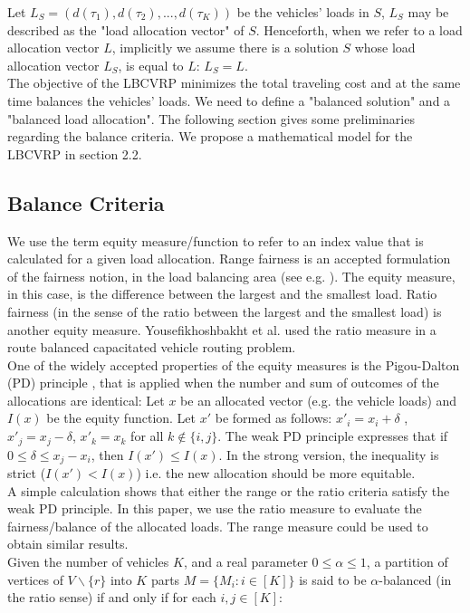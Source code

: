 \indent Let $L_S=(d(\tau_1),d(\tau_2),...,d(\tau_K))$ be the vehicles' loads in $S$, $L_S$ may be described as the "load allocation vector" of $S$. Henceforth, when we refer to a load allocation vector $L$, implicitly we assume there is a solution $S$ whose load allocation vector $L_S$, is equal to $L$: $L_S=L$. \\
\indent The objective of the LBCVRP minimizes the total traveling cost and at the same time balances the vehicles' loads. We need to define a "balanced solution" and a "balanced load allocation". The following section gives some preliminaries regarding the balance criteria. We propose a mathematical model for the LBCVRP in section 2.2.
\subsection{Balance Criteria}
\noindent We use the term equity measure/function to refer to an index value that is calculated for a given load allocation. Range fairness is an accepted formulation of the fairness notion, in the load balancing area (see e.g. \cite{Chen2008,Tsouros}). The equity measure, in this case, is the difference between the largest and the smallest load. Ratio fairness (in the sense of the ratio between the largest and the smallest load) is another equity measure. Yousefikhoshbakht et al. \cite{Yousefikhoshbakht} used the ratio measure in a route balanced capacitated vehicle routing problem. \\
\indent One of the widely accepted properties of the equity measures is the Pigou-Dalton (PD) principle \cite{Cowell}, that is applied when the number and sum of outcomes of the allocations are identical: Let $x$  be an allocated vector (e.g.
 the vehicle loads) and $I(x)$ be the equity function. Let $x'$  be formed as follows: ${x'_i} = {x_i} + \delta $ , ${x'_j} = {x_j} - \delta $,  ${x'_k} = {x_k}$ for all $k \notin \{ i,j\} $. The weak PD principle expresses that if $0 \le \delta  \le {x_j} - {x_i}$, then $I(x') \le I(x)$. In the strong version, the inequality is strict ($I(x') < I(x)$) i.e. the new allocation should be more equitable. \\
\indent A simple calculation shows that either the range or the ratio criteria satisfy the weak PD principle. In this paper, we use the ratio measure to evaluate the fairness/balance of the allocated loads. The range measure could be used to obtain similar results. \\
\indent Given the number of vehicles $K$, and a real parameter $0 \le \alpha  \le 1$, a partition of vertices of $V\backslash \{r\}$ into $K$ parts $M=\{ {M_i}:i \in [K]\} $ is said to be $\alpha$-balanced (in the ratio sense) if and only if for each $i,j \in [K]$:
